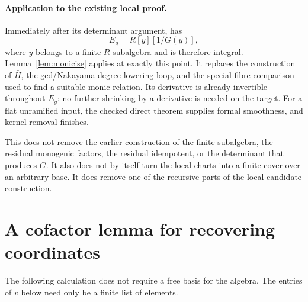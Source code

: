 \documentclass[11pt]{article}
\begin{document}
\paragraph{Application to the existing local proof.}
Immediately after its determinant argument,
 has
\[
                         E_g=R[y][1/G(y)],
\]
where $y$ belongs to a finite $R$-subalgebra and is therefore integral.
Lemma~\ref{lem:monicise} applies at exactly this point. It replaces the
construction of $\bar H$, the gcd/Nakayama degree-lowering loop, and
the special-fibre comparison used to find a suitable monic relation.
Its derivative is already invertible throughout $E_g$: no further
shrinking by a derivative is needed on the target. For a flat
unramified input, the checked direct theorem supplies formal smoothness,
and kernel removal finishes.

This does not remove the earlier construction of the finite subalgebra,
the residual monogenic factors, the residual idempotent, or the
determinant that produces $G$. It also does not by itself turn the
local charts into a finite cover over an arbitrary base. It does remove
one of the recursive parts of the local candidate construction.

\section{A cofactor lemma for recovering coordinates}

The following calculation does not require a free basis for the algebra.
The entries of $v$ below need only be a finite list of elements.
\end{document}
